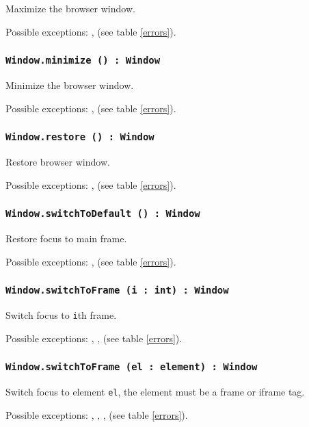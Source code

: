 Maximize the browser window.

Possible exceptions: ,  (see table \ref{errors}).

\subsubsection{\texttt{Window.minimize () : Window}}

Minimize the browser window.

Possible exceptions: ,  (see table \ref{errors}).

\subsubsection{\texttt{Window.restore () : Window}}

Restore browser window.

Possible exceptions: ,  (see table \ref{errors}).

\subsubsection{\texttt{Window.switchToDefault () : Window}}

Restore focus to main frame.

Possible exceptions: ,  (see table \ref{errors}).

\subsubsection{\texttt{Window.switchToFrame (i : int) : Window}}

Switch focus to \texttt{i}th frame.

Possible exceptions: , ,  (see table \ref{errors}).

\subsubsection{\texttt{Window.switchToFrame (el : element) : Window}}

Switch focus to element \texttt{el}, the element must be a frame or iframe tag.

Possible exceptions: , , ,  (see table \ref{errors}).

